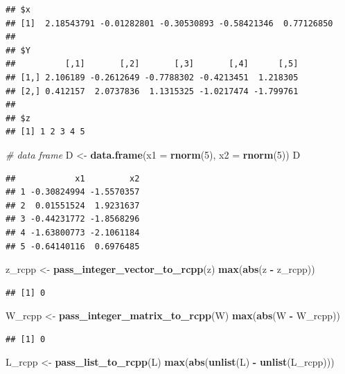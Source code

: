 \documentclass[]{book}
\newenvironment{Shaded}{\begin{snugshade}}{\end{snugshade}}
\newcommand{\KeywordTok}[1]{\textcolor[rgb]{0.13,0.29,0.53}{\textbf{#1}}}
\newcommand{\DataTypeTok}[1]{\textcolor[rgb]{0.13,0.29,0.53}{#1}}
\newcommand{\DecValTok}[1]{\textcolor[rgb]{0.00,0.00,0.81}{#1}}
\newcommand{\StringTok}[1]{\textcolor[rgb]{0.31,0.60,0.02}{#1}}
\newcommand{\CommentTok}[1]{\textcolor[rgb]{0.56,0.35,0.01}{\textit{#1}}}
\newcommand{\OperatorTok}[1]{\textcolor[rgb]{0.81,0.36,0.00}{\textbf{#1}}}
\newcommand{\NormalTok}[1]{#1}
\begin{document}
\begin{verbatim}
## $x
## [1]  2.18543791 -0.01282801 -0.30530893 -0.58421346  0.77126850
## 
## $Y
##          [,1]       [,2]       [,3]       [,4]      [,5]
## [1,] 2.106189 -0.2612649 -0.7788302 -0.4213451  1.218305
## [2,] 0.412157  2.0737836  1.1315325 -1.0217474 -1.799761
## 
## $z
## [1] 1 2 3 4 5
\end{verbatim}

\begin{Shaded}
\begin{Highlighting}[]
\CommentTok{# data frame}
\NormalTok{D <-}\StringTok{ }\KeywordTok{data.frame}\NormalTok{(}\DataTypeTok{x1 =} \KeywordTok{rnorm}\NormalTok{(}\DecValTok{5}\NormalTok{), }\DataTypeTok{x2 =} \KeywordTok{rnorm}\NormalTok{(}\DecValTok{5}\NormalTok{))}
\NormalTok{D}
\end{Highlighting}
\end{Shaded}

\begin{verbatim}
##            x1         x2
## 1 -0.30824994 -1.5570357
## 2  0.01551524  1.9231637
## 3 -0.44231772 -1.8568296
## 4 -1.63800773 -2.1061184
## 5 -0.64140116  0.6976485
\end{verbatim}

\begin{Shaded}
\begin{Highlighting}[]
\NormalTok{z_rcpp <-}\StringTok{ }\KeywordTok{pass_integer_vector_to_rcpp}\NormalTok{(z)}
\KeywordTok{max}\NormalTok{(}\KeywordTok{abs}\NormalTok{(z }\OperatorTok{-}\StringTok{ }\NormalTok{z_rcpp))}
\end{Highlighting}
\end{Shaded}

\begin{verbatim}
## [1] 0
\end{verbatim}

\begin{Shaded}
\begin{Highlighting}[]
\NormalTok{W_rcpp <-}\StringTok{ }\KeywordTok{pass_integer_matrix_to_rcpp}\NormalTok{(W)}
\KeywordTok{max}\NormalTok{(}\KeywordTok{abs}\NormalTok{(W }\OperatorTok{-}\StringTok{ }\NormalTok{W_rcpp))}
\end{Highlighting}
\end{Shaded}

\begin{verbatim}
## [1] 0
\end{verbatim}

\begin{Shaded}
\begin{Highlighting}[]
\NormalTok{L_rcpp <-}\StringTok{ }\KeywordTok{pass_list_to_rcpp}\NormalTok{(L)}
\KeywordTok{max}\NormalTok{(}\KeywordTok{abs}\NormalTok{(}\KeywordTok{unlist}\NormalTok{(L) }\OperatorTok{-}\StringTok{ }\KeywordTok{unlist}\NormalTok{(L_rcpp)))}
\end{Highlighting}
\end{Shaded}
\end{document}
